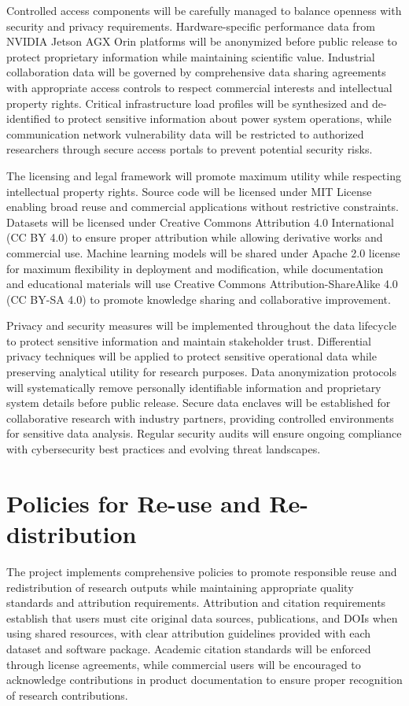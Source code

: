 \documentclass[12pt]{article}
\begin{document}
Controlled access components will be carefully managed to balance openness with security and privacy requirements. Hardware-specific performance data from NVIDIA Jetson AGX Orin platforms will be anonymized before public release to protect proprietary information while maintaining scientific value. Industrial collaboration data will be governed by comprehensive data sharing agreements with appropriate access controls to respect commercial interests and intellectual property rights. Critical infrastructure load profiles will be synthesized and de-identified to protect sensitive information about power system operations, while communication network vulnerability data will be restricted to authorized researchers through secure access portals to prevent potential security risks.

The licensing and legal framework will promote maximum utility while respecting intellectual property rights. Source code will be licensed under MIT License enabling broad reuse and commercial applications without restrictive constraints. Datasets will be licensed under Creative Commons Attribution 4.0 International (CC BY 4.0) to ensure proper attribution while allowing derivative works and commercial use. Machine learning models will be shared under Apache 2.0 license for maximum flexibility in deployment and modification, while documentation and educational materials will use Creative Commons Attribution-ShareAlike 4.0 (CC BY-SA 4.0) to promote knowledge sharing and collaborative improvement.

Privacy and security measures will be implemented throughout the data lifecycle to protect sensitive information and maintain stakeholder trust. Differential privacy techniques will be applied to protect sensitive operational data while preserving analytical utility for research purposes. Data anonymization protocols will systematically remove personally identifiable information and proprietary system details before public release. Secure data enclaves will be established for collaborative research with industry partners, providing controlled environments for sensitive data analysis. Regular security audits will ensure ongoing compliance with cybersecurity best practices and evolving threat landscapes.

\section{Policies for Re-use and Re-distribution}

The project implements comprehensive policies to promote responsible reuse and redistribution of research outputs while maintaining appropriate quality standards and attribution requirements. Attribution and citation requirements establish that users must cite original data sources, publications, and DOIs when using shared resources, with clear attribution guidelines provided with each dataset and software package. Academic citation standards will be enforced through license agreements, while commercial users will be encouraged to acknowledge contributions in product documentation to ensure proper recognition of research contributions.
\end{document}
